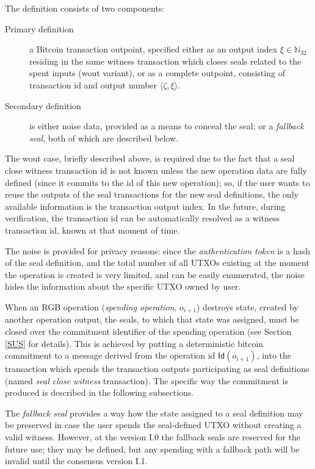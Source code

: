 \documentclass[9pt,oneside]{amsart}
\begin{document}
\begin{multicols}{2}
The definition consists of two components:
\begin{description}
\item[Primary definition] a Bitcoin transaction outpoint,
    specified either as an output index $\xi \in \mathbb{N}_{32}$
    residing in the same witness transaction which closes seals related to the spent inputs
    (\textsf{wout} variant), or as a complete outpoint,
    consisting of transaction id and output number $\langle \zeta, \xi\rangle$.
\item[Secondary definition] is either noise data, provided as a means to conceal the seal;
    or a \emph{fallback seal}, both of which are described below.
\end{description}

The \textsf{wout} case, briefly described above, is required due to the fact that
a seal close witness transaction id is not known unless the new operation data are fully defined
(since it commits to the id of this new operation);
so, if the user wants to reuse the outputs of the seal transactions for the new seal
definitions, the only available information is the transaction output index.
In the future, during verification, the transaction id can be automatically resolved
as a witness transaction id, known at that moment of time.

The noise is provided for privacy reasons:
since the \emph{authentication token} is a hash of the seal definition,
and the total number of all UTXOs existing at the moment the operation is created is very limited,
and can be easily enumerated, the noise hides the information about the specific UTXO owned by user.

When an RGB operation (\emph{spending operation}, $o_{i+1}$) destroys state,
created by another operation output, the seals, to which that state was assigned,
must be closed over the commitment identifier of the spending operation
(see Section \ref{SUS} for details).
This is achieved by putting a deterministic bitcoin commitment to
a message derived from the operation id $\mathsf{Id}(o_{i+1})$,
into the transaction which spends the transaction outputs participating as seal definitions
(named \emph{seal close witness} transaction).
The specific way the commitment is produced is described in the following subsections.

The \emph{fallback seal} provides a way how the state assigned to a seal definition
may be preserved in case the user spends the seal-defined UTXO without creating a valid witness.
However, at the version I.0 the fallback seals are reserved for the future use;
they may be defined, but any spending with a fallback path will be invalid
until the consensus version I.1.


\end{multicols}
\end{document}

